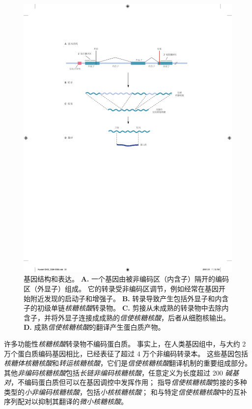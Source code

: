 \begin{figure}[htbp]
	\centering
	\includegraphics[width=0.9\linewidth]{chap02/fig_2_3}
	\caption{基因结构和表达。
		\textbf{A.} 一个基因由被非编码区（内含子）隔开的编码区（外显子）组成。
		它的转录受非编码区调节，例如经常在基因开始附近发现的启动子和增强子。
		\textbf{B.} 转录导致产生包括外显子和内含子的初级单链\textit{核糖核酸}转录物。
		\textbf{C.} 剪接从未成熟的转录物中去除内含子，并将外显子连接成成熟的\textit{信使核糖核酸}，后者从细胞核输出。
		\textbf{D.} 成熟\textit{信使核糖核酸}的翻译产生蛋白质产物。}
	\label{fig:2_3}
\end{figure}


许多功能性\textit{核糖核酸}转录物不编码蛋白质。 
事实上，在人类基因组中，与大约 2 万个蛋白质编码基因相比，已经表征了超过 4 万个非编码转录本。
这些基因包括\textit{核糖体核糖核酸}和\textit{转运核糖核酸}，它们是\textit{信使核糖核酸}翻译机制的重要组成部分。
其他\textit{非编码核糖核酸}包括\textit{长链非编码核糖核酸}，任意定义为长度超过 200 \textit{碱基对}，不编码蛋白质但可以在基因调控中发挥作用；
指导\textit{信使核糖核酸}剪接的多种类型的\textit{小非编码核糖核酸}，包括\textit{小核核糖核酸}；
和与特定\textit{信使核糖核酸}中的互补序列配对以抑制其翻译的\textit{微小核糖核酸}。


